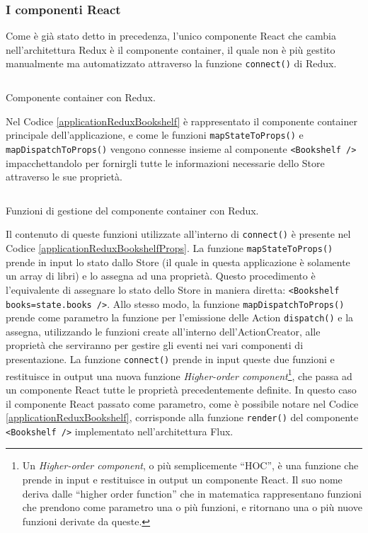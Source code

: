 \subsubsection*{I componenti React}
Come è già stato detto in precedenza, l'unico componente React che cambia nell'architettura Redux è il componente container, il quale non è più gestito manualmente ma automatizzato attraverso la funzione \texttt{connect()} di Redux.

\begin{listing}[ht]
\inputminted{javascript}{sources/applicationReduxBookshelf.js}
\caption{Componente container con Redux.} 
\label{applicationReduxBookshelf} 
\end{listing}

Nel Codice \ref{applicationReduxBookshelf} è rappresentato il componente container principale dell'applicazione, e come le funzioni \texttt{mapStateToProps()} e \texttt{mapDispatchToProps()} vengono connesse insieme al componente \texttt{<Bookshelf />} impacchettandolo per fornirgli tutte le informazioni necessarie dello Store attraverso le sue proprietà.

\begin{listing}[ht]
\inputminted{javascript}{sources/applicationReduxBookshelfProps.js}
\caption{Funzioni di gestione del componente container con Redux.} 
\label{applicationReduxBookshelfProps} 
\end{listing} 

Il contenuto di queste funzioni utilizzate all'interno di \texttt{connect()} è presente nel Codice \ref{applicationReduxBookshelfProps}. La funzione \texttt{mapStateToProps()} prende in input lo stato dallo Store (il quale in questa applicazione è solamente un array di libri) e lo assegna ad una proprietà. Questo procedimento è l'equivalente di assegnare lo stato dello Store in maniera diretta: \texttt{<Bookshelf books={state.books} />}.
Allo stesso modo, la funzione \texttt{mapDispatchToProps()} prende come parametro la funzione per l'emissione delle Action \texttt{dispatch()} e la assegna, utilizzando le funzioni create all'interno dell'ActionCreator, alle proprietà che serviranno per gestire gli eventi nei vari componenti di presentazione.
La funzione \texttt{connect()} prende in input queste due funzioni e restituisce in output una nuova funzione \textit{Higher-order component}\footnote{Un \textit{Higher-order component}, o più semplicemente “HOC”, è una funzione che prende in input e restituisce in output un componente React. Il suo nome deriva dalle “higher order function” che in matematica rappresentano funzioni che prendono come parametro una o più funzioni, e ritornano una o più nuove funzioni derivate da queste.}, che passa ad un componente React tutte le proprietà precedentemente definite. In questo caso il componente React passato come parametro, come è possibile notare nel Codice \ref{applicationReduxBookshelf}, corrisponde alla funzione \texttt{render()} del componente \texttt{<Bookshelf />} implementato nell'architettura Flux.

